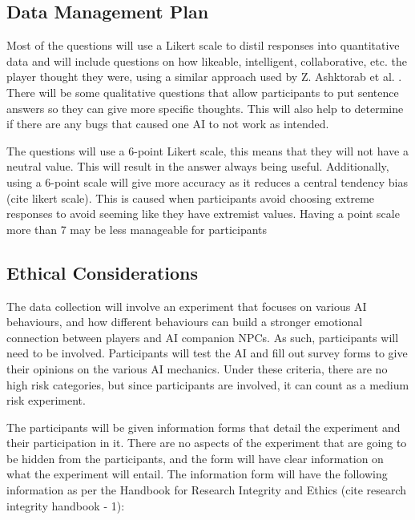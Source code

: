 \documentclass{IEEEtran}
\begin{document}

\subsection{Data Management Plan}
\label{DataManagementPlan}


Most of the questions will use a Likert scale to distil responses into quantitative data and will include questions on how likeable, intelligent, collaborative, etc. the player thought they were, using a similar approach used by Z. Ashktorab et al. \cite{SocialPerceptions2020}. There will be some qualitative questions that allow participants to put sentence answers so they can give more specific thoughts. This will also help to determine if there are any bugs that caused one AI to not work as intended.

The questions will use a 6-point Likert scale, this means that they will not have a neutral value. This will result in the answer always being useful. Additionally, using a 6-point scale will give more accuracy as it reduces a central tendency bias (cite likert scale). This is caused when participants avoid choosing extreme responses to avoid seeming like they have extremist values. Having a point scale more than 7 may be less manageable for participants


\subsection{Ethical Considerations}
\label{EthicalConsiderations}

The data collection will involve an experiment that focuses on various AI behaviours, and how different behaviours can build a stronger emotional connection between players and AI companion NPCs. As such, participants will need to be involved. Participants will test the AI and fill out survey forms to give their opinions on the various AI mechanics. Under these criteria, there are no high risk categories, but since participants are involved, it can count as a medium risk experiment.

The participants will be given information forms that detail the experiment and their participation in it. There are no aspects of the experiment that are going to be hidden from the participants, and the form will have clear information on what the experiment will entail. The information form will have the following information as per the Handbook for Research Integrity and Ethics (cite research integrity handbook - 1):
\end{document}
